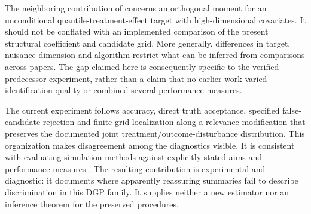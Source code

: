 The neighboring contribution of \textcite{jin_sun_2025} concerns an orthogonal moment for an unconditional quantile-treatment-effect target with high-dimensional covariates. It should not be conflated with an implemented comparison of the present structural coefficient and candidate grid. More generally, differences in target, nuisance dimension and algorithm restrict what can be inferred from comparisons across papers. The gap claimed here is consequently specific to the verified predecessor experiment, rather than a claim that no earlier work varied identification quality or combined several performance measures.

The current experiment follows accuracy, direct truth acceptance, specified false-candidate rejection and finite-grid localization along a relevance modification that preserves the documented joint treatment/outcome-disturbance distribution. This organization makes disagreement among the diagnostics visible. It is consistent with evaluating simulation methods against explicitly stated aims and performance measures \parencite{morris_white_crowther_2019}. The resulting contribution is experimental and diagnostic: it documents where apparently reassuring summaries fail to describe discrimination in this DGP family. It supplies neither a new estimator nor an inference theorem for the preserved procedures.
